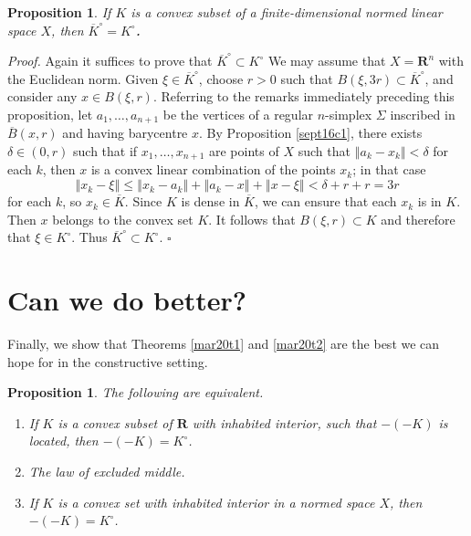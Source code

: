 \documentclass[11pt]{article}%
\newtheorem{proposition}[theorem]{Proposition}
\newenvironment{proof}[1][Proof]{\noindent\textit{#1.} }{}
\begin{document}
\begin{proposition}
\label{mar24p1}If $K$ is a convex subset of a finite-dimensional normed linear
space $X$, then $\overline{K}^{\circ}=K^{\circ}$\textbf{.}
\end{proposition}

\begin{proof}
Again it suffices to prove that $\overline{K}^{\circ}\subset K^{\circ}$ We may
assume that $X=\mathbf{R}^{n}$ with the Euclidean norm. Given $\xi\in
\overline{K}^{\circ}$, choose $r>0$ such that $B(\xi,3r)\subset\overline
{K}^{\circ}$, and consider any $x\in B(\xi,r)$. Referring to the remarks
immediately preceding this proposition, let $a_{1},\ldots,a_{n+1}$ be the
vertices of a regular $n$-simplex $\Sigma$ inscribed in $\overline{B}(x,r)$
and having barycentre $x$. By Proposition \ref{sept16c1}, there exists
$\delta\in\left(  0,r\right)  $ such that if $x_{1},\ldots,x_{n+1}$ are points
of $X$ such that $\left\Vert a_{k}-x_{k}\right\Vert <\delta$ for each $k$,
then $x$ is a convex linear combination of the points $x_{k}$; in that case%
\[
\left\Vert x_{k}-\xi\right\Vert \leq\left\Vert x_{k}-a_{k}\right\Vert
+\left\Vert a_{k}-x\right\Vert +\left\Vert x-\xi\right\Vert <\delta+r+r=3r
\]
for each $k$, so $x_{k}\in\overline{K}$. Since $K$ is dense in $\overline{K}$,
we can ensure that each $x_{k}$ is in $K$. Then $x$ belongs to the convex set
$K$. It follows that $B(\xi,r)\subset K$ and therefore that $\xi\in K^{\circ}%
$. Thus $\overline{K}^{\circ}\subset K^{\circ}$.%
\hfill
$\square$
\end{proof}

\section{Can we do better?}

Finally, we show that Theorems \ref{mar20t1} and \ref{mar20t2} are the best we
can hope for in the constructive setting.

\begin{proposition}
\label{oct03p2}The following are equivalent.

\begin{enumerate}
\item[\emph{(i)}] If $K$ is a convex subset of $\mathbf{R}$ with inhabited
interior, such that $-(-K)$ is located, then $-(-K)=K^{\circ}$.

\item[\emph{(ii)}] The law of excluded middle.

\item[\emph{(iii)}] If $K$ is a convex set with inhabited interior in a normed
space $X$, then $-(-K)=K^{\circ}$.
\end{enumerate}
\end{proposition}
\end{document}
